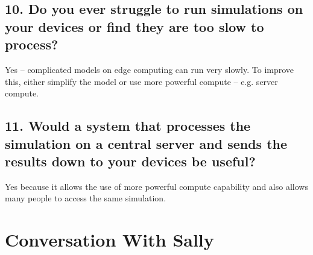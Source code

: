 \subsection*{10. Do you ever struggle to run simulations on your devices or find they are too slow to process?}
Yes – complicated models on edge computing can run very slowly. To improve this, either simplify the model or use more powerful compute – e.g. server compute.
\subsection*{11. Would a system that processes the simulation on a central server and sends the results down to your devices be useful?}
Yes because it allows the use of more powerful compute capability and also allows many people to access the same simulation.
\section{Conversation With Sally}
\label{sec:interviewSally}

